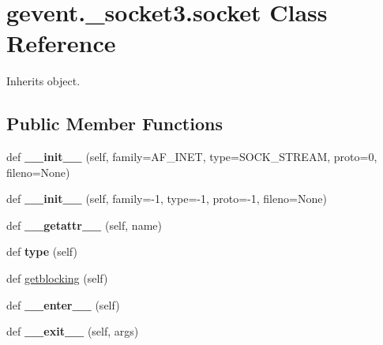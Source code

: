 \hypertarget{classgevent_1_1__socket3_1_1socket}{}\section{gevent.\+\_\+socket3.\+socket Class Reference}
\label{classgevent_1_1__socket3_1_1socket}


Inherits object.

\subsection*{Public Member Functions}
\begin{DoxyCompactItemize}
\item 
\mbox{\label{classgevent_1_1__socket3_1_1socket_ab48b990e2395265e99653c63bf46c615}} 
def {\bfseries \+\_\+\+\_\+init\+\_\+\+\_\+} (self, family=A\+F\+\_\+\+I\+N\+ET, type=S\+O\+C\+K\+\_\+\+S\+T\+R\+E\+AM, proto=0, fileno=None)
\item 
\mbox{\label{classgevent_1_1__socket3_1_1socket_a19d90c05ade878233c24b375f1df8324}} 
def {\bfseries \+\_\+\+\_\+init\+\_\+\+\_\+} (self, family=-\/1, type=-\/1, proto=-\/1, fileno=None)
\item 
\mbox{\label{classgevent_1_1__socket3_1_1socket_add2591535bc327240b3fefa3bbb47dfb}} 
def {\bfseries \+\_\+\+\_\+getattr\+\_\+\+\_\+} (self, name)
\item 
\mbox{\label{classgevent_1_1__socket3_1_1socket_a59c0202ce1d408297ba3d4fc8896da6b}} 
def {\bfseries type} (self)
\item 
def \hyperlink{classgevent_1_1__socket3_1_1socket_a6ef84a09239b22b55ffd02a5c520aa75}{getblocking} (self)
\item 
\mbox{\label{classgevent_1_1__socket3_1_1socket_abd9cca88969b2fc178ba3a6623696a36}} 
def {\bfseries \+\_\+\+\_\+enter\+\_\+\+\_\+} (self)
\item 
\mbox{\label{classgevent_1_1__socket3_1_1socket_a69d2ba02d9c2b2cf84f64c241b54c238}} 
def {\bfseries \+\_\+\+\_\+exit\+\_\+\+\_\+} (self, args)

\end{DoxyCompactItemize}
